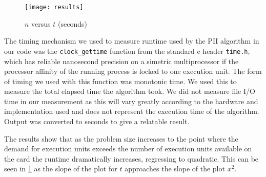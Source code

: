 \documentclass[journal]{IEEEtran}
\begin{document}
%





\begin{figure}[!t]
\centering
\texttt{[image: results]}
\caption{$n$ versus $t$ (seconds)}
\label{results}
\end{figure}

The timing mechanism we used to measure runtime used by the PII algorithm in
our code was the \texttt{clock\_gettime} function from the standard c header
\texttt{time.h}, which has reliable nanosecond precision on a simetric
multiprocessor if the processor affinity of the running process is locked to
one execution unit. The form of timing we used with this function was monotonic
time. We used this to measure the total elapsed time the algorithm took. We did
not measure file I/O time in our measurement as this will vary greatly
according to the hardware and implementation used and does not represent the
execution time of the algorithm.  Output was converted to seconds to give a
relatable result.

The results show that as the problem size increases to the point where the
demand for execution units exceeds the number of execution units available on
the card the runtime dramatically increases, regressing to quadratic.  This can
be seen in \ref{results} as the slope of the plot for $t$ approaches the slope of
the plot $x^2$.
\end{document}
